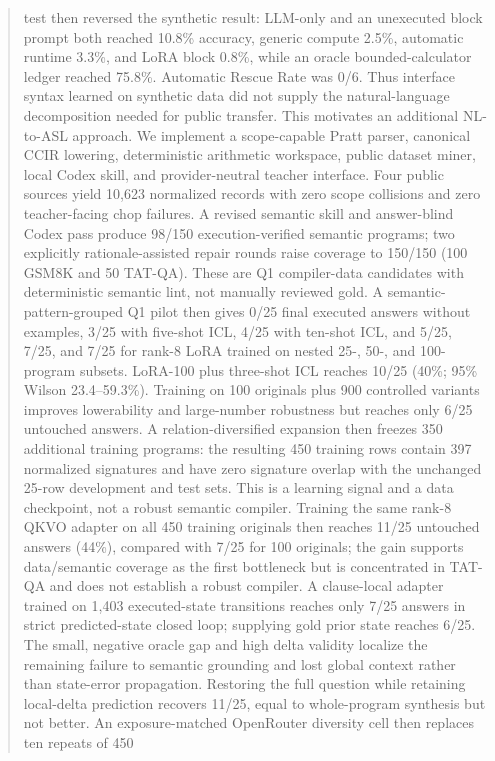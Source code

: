 \documentclass[11pt]{article}
\begin{document}
\begin{abstract}
test then reversed the synthetic result: LLM-only and an unexecuted block prompt
both reached 10.8\% accuracy, generic compute 2.5\%, automatic runtime 3.3\%, and
LoRA block 0.8\%, while an oracle bounded-calculator ledger reached 75.8\%.
Automatic Rescue Rate was 0/6. Thus interface syntax learned on synthetic data
did not supply the natural-language decomposition needed for public transfer.
This motivates an additional NL-to-ASL approach. We implement a scope-capable
Pratt parser, canonical CCIR lowering, deterministic arithmetic workspace, public
dataset miner, local Codex skill, and provider-neutral teacher interface. Four
public sources yield 10,623 normalized records with zero scope collisions and
zero teacher-facing chop failures. A revised semantic skill and answer-blind
Codex pass produce 98/150 execution-verified semantic programs; two explicitly
rationale-assisted repair rounds raise coverage to 150/150 (100 GSM8K and 50
TAT-QA). These are Q1 compiler-data candidates with deterministic semantic lint,
not manually reviewed gold. A semantic-pattern-grouped Q1 pilot then gives
0/25 final executed answers without examples, 3/25 with five-shot ICL, 4/25 with
ten-shot ICL, and 5/25, 7/25, and 7/25 for rank-8 LoRA trained on nested 25-,
50-, and 100-program subsets. LoRA-100 plus three-shot ICL reaches 10/25
(40\%; 95\% Wilson 23.4--59.3\%). Training on 100 originals plus 900 controlled
variants improves lowerability and large-number robustness but reaches only 6/25
untouched answers. A relation-diversified expansion then freezes 350 additional
training programs: the resulting 450 training rows contain 397 normalized
signatures and have zero signature overlap with the unchanged 25-row development
and test sets. This is a learning signal and a data checkpoint, not a robust
semantic compiler. Training the same rank-8 QKVO adapter on all 450 training
originals then reaches 11/25 untouched answers (44\%), compared with 7/25 for
100 originals; the gain supports data/semantic coverage as the first bottleneck
but is concentrated in TAT-QA and does not establish a robust compiler. A
clause-local adapter trained on 1,403 executed-state transitions reaches only
7/25 answers in strict predicted-state closed loop; supplying gold prior state
reaches 6/25. The small, negative oracle gap and high delta validity localize the
remaining failure to semantic grounding and lost global context rather than
state-error propagation. Restoring the full question while retaining local-delta
prediction recovers 11/25, equal to whole-program synthesis but not better.
An exposure-matched OpenRouter diversity cell then replaces ten repeats of 450

\end{abstract}
\end{document}

